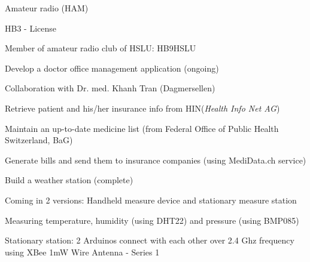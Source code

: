 

\begin{cventries}

  \cventry
  {} %
  {Amateur radio (HAM)} %
  {} %
  {} %
  {\vspace{-12pt}
    \begin{cvitems} %
      \item {HB3 - License}
      \item {Member of amateur radio club of HSLU: HB9HSLU}
    \end{cvitems}
  }

\cventry
{} %
{Develop a doctor office management application (ongoing)} %
{} %
{} %
{\vspace{-12pt}
	\begin{cvitems} %
		\item {Collaboration with Dr. med. Khanh Tran (Dagmersellen)}
		\item {Retrieve patient and his/her insurance info from HIN(\textit{Health Info Net AG})}
		\item {Maintain an up-to-date medicine list (from Federal Office of Public Health Switzerland, BaG)}
		\item {Generate bills and send them to insurance companies (using MediData.ch service)}
	\end{cvitems}
}

\cventry
{} %
{Build a weather station (complete)} %
{} %
{} %
{\vspace{-12pt}
	\begin{cvitems} %
		\item {Coming in 2 versions: Handheld measure device and stationary measure station}
		\item {Measuring temperature, humidity (using DHT22) and pressure (using BMP085)}
		\item {Stationary station: 2 Arduinos connect with each other over 2.4 Ghz frequency using XBee 1mW Wire Antenna - Series 1}
	\end{cvitems}
}


\end{cventries}
